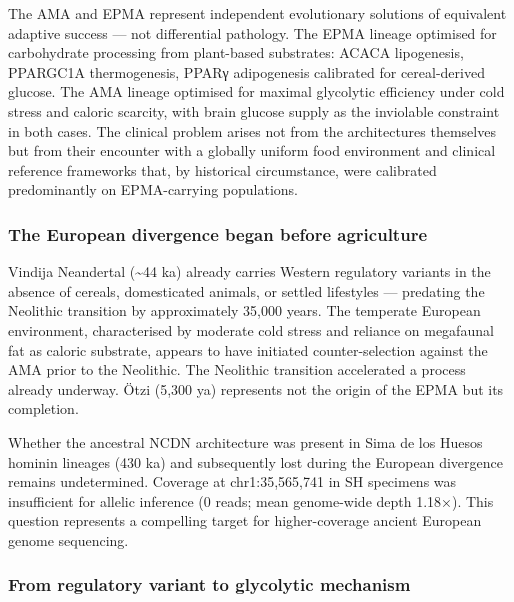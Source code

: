 \documentclass[
  letterpaper,
  DIV=11,
  numbers=noendperiod]{scrartcl}
\begin{document}
The AMA and EPMA represent independent evolutionary solutions of
equivalent adaptive success --- not differential pathology. The EPMA
lineage optimised for carbohydrate processing from plant-based
substrates: ACACA lipogenesis, PPARGC1A thermogenesis, PPARγ
adipogenesis calibrated for cereal-derived glucose. The AMA lineage
optimised for maximal glycolytic efficiency under cold stress and
caloric scarcity, with brain glucose supply as the inviolable constraint
in both cases. The clinical problem arises not from the architectures
themselves but from their encounter with a globally uniform food
environment and clinical reference frameworks that, by historical
circumstance, were calibrated predominantly on EPMA-carrying
populations.

\subsubsection{The European divergence began before
agriculture}\label{the-european-divergence-began-before-agriculture}

Vindija Neandertal (\textasciitilde44 ka) already carries Western
regulatory variants in the absence of cereals, domesticated animals, or
settled lifestyles --- predating the Neolithic transition by
approximately 35,000 years. The temperate European environment,
characterised by moderate cold stress and reliance on megafaunal fat as
caloric substrate, appears to have initiated counter-selection against
the AMA prior to the Neolithic. The Neolithic transition accelerated a
process already underway. Ötzi (5,300 ya) represents not the origin of
the EPMA but its completion.

Whether the ancestral NCDN architecture was present in Sima de los
Huesos hominin lineages (430 ka) and subsequently lost during the
European divergence remains undetermined. Coverage at chr1:35,565,741 in
SH specimens was insufficient for allelic inference (0 reads; mean
genome-wide depth 1.18×). This question represents a compelling target
for higher-coverage ancient European genome sequencing.

\subsubsection{From regulatory variant to glycolytic
mechanism}\label{from-regulatory-variant-to-glycolytic-mechanism}
\end{document}
